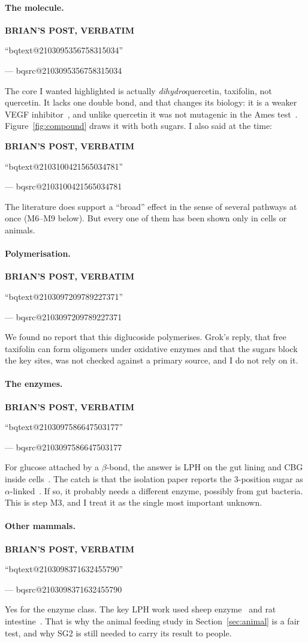 \documentclass[11pt,a4paper]{article}
\makeatletter
\newcommand{\BQ}[1]{\begin{tcolorbox}[bqstyle]%
{\sffamily\bfseries\footnotesize\color{teal!80!black}BRIAN'S POST, VERBATIM}\par\smallskip
``\csname bqtext@#1\endcsname''\par\smallskip
{\raggedleft\footnotesize --- \csname bqsrc@#1\endcsname\par}\end{tcolorbox}}
\makeatother
\begin{document}
\paragraph{The molecule.}
\BQ{2103095356758315034}

\noindent The core I wanted highlighted is actually \emph{dihydro}quercetin, taxifolin, not quercetin. It lacks one double bond, and that changes its biology: it is a weaker VEGF inhibitor~\cite{luo2008}, and unlike quercetin it was not mutagenic in the Ames test~\cite{bjeldanes1977}. Figure~\ref{fig:compound} draws it with both sugars. I also said at the time:

\BQ{2103100421565034781}

\noindent The literature does support a ``broad'' effect in the sense of several pathways at once (M6--M9 below). But every one of them has been shown only in cells or animals.

\paragraph{Polymerisation.}
\BQ{2103097209789227371}

\noindent We found no report that this diglucoside polymerises. Grok's reply, that free taxifolin can form oligomers under oxidative enzymes and that the sugars block the key sites, was not checked against a primary source, and I do not rely on it.

\paragraph{The enzymes.}
\BQ{2103097586647503177}

\noindent For glucose attached by a $\beta$-bond, the answer is LPH on the gut lining and CBG inside cells~\cite{day1998,day2000,nemeth2003}. The catch is that the isolation paper reports the 3-position sugar as $\alpha$-linked~\cite{prasad2005}. If so, it probably needs a different enzyme, possibly from gut bacteria. This is step M3, and I treat it as the single most important unknown.

\paragraph{Other mammals.}
\BQ{2103098371632455790}

\noindent Yes for the enzyme class. The key LPH work used sheep enzyme~\cite{day2000} and rat intestine~\cite{day2003}. That is why the animal feeding study in Section~\ref{sec:animal} is a fair test, and why SG2 is still needed to carry its result to people.
\end{document}
